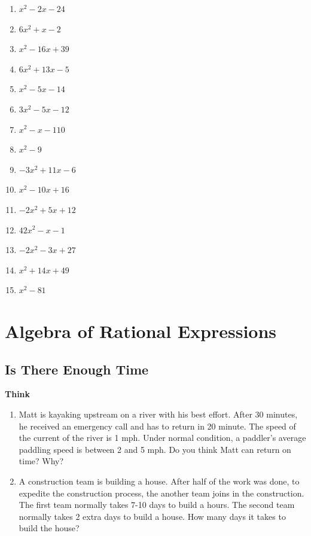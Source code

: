 \documentclass[en,12pt]{elegantbook}
\providecommand{\tightlist}{%
  \setlength{\itemsep}{0pt}\setlength{\parskip}{0pt}}
\newenvironment{rmdthink}{
	\par\noindent
	{
		\makebox[-\width][r]{
			\footnotesize
			\color{green!90}\faLightbulbO
			\hspace*{3pt}
		}
			\textbf{
				\color{second}
				Think 
			}
    }
    \begin{shaded}
    \sffamily
}{
    \par\medskip\ignorespacesafterend
    \end{shaded}
}
\providecommand{\tightlist}{%
  \setlength{\itemsep}{0pt}\setlength{\parskip}{0pt}}
\begin{document}
\begin{enumerate}
\def\labelenumi{\arabic{enumi}.}
\tightlist
\item
  \(x^2-2x-24\)
\item
  \(6x^2+x-2\)
\item
  \(x^2-16x+39\)
\item
  \(6x^2+13x-5\)
\item
  \(x^2-5x-14\)
\item
  \(3x^2-5x-12\)
\item
  \(x^2-x-110\)
\item
  \(x^2-9\)
\item
  \(-3x^2+11x-6\)
\item
  \(x^2-10x+16\)
\item
  \(-2x^2+5x+12\)
\item
  \(42x^2-x-1\)
\item
  \(-2x^2-3x+27\)
\item
  \(x^2+14x+49\)
\item
  \(x^2-81\)
\end{enumerate}

\hypertarget{algebra-of-rational-expressions}{%
\chapter{Algebra of Rational Expressions}\label{algebra-of-rational-expressions}}

\hypertarget{is-there-enough-time}{%
\section{Is There Enough Time}\label{is-there-enough-time}}

\begin{rmdthink}

\begin{enumerate}
\def\labelenumi{\arabic{enumi}.}
\item
  Matt is kayaking upstream on a river with his best effort. After 30 minutes, he received an emergency call and has to return in 20 minute. The speed of the current of the river is 1 mph. Under normal condition, a paddler's average paddling speed is between 2 and 5 mph. Do you think Matt can return on time? Why?
\item
  A construction team is building a house. After half of the work was done, to expedite the construction process, the another team joins in the construction. The first team normally takes 7-10 days to build a hours. The second team normally takes 2 extra days to build a house. How many days it takes to build the house?
\end{enumerate}

\end{rmdthink}
\end{document}
